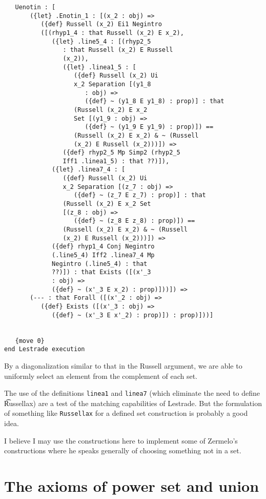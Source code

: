 \documentclass[12pt]{article}
\begin{document}
\begin{verbatim}
   Uenotin : [
       ({let} .Enotin_1 : [(x_2 : obj) => 
          ({def} Russell (x_2) Ei1 Negintro 
          ([(rhyp1_4 : that Russell (x_2) E x_2), 
             ({let} .line5_4 : [(rhyp2_5 
                : that Russell (x_2) E Russell 
                (x_2)), 
                ({let} .linea1_5 : [
                   ({def} Russell (x_2) Ui 
                   x_2 Separation [(y1_8 
                      : obj) => 
                      ({def} ~ (y1_8 E y1_8) : prop)] : that 
                   (Russell (x_2) E x_2 
                   Set [(y1_9 : obj) => 
                      ({def} ~ (y1_9 E y1_9) : prop)]) == 
                   (Russell (x_2) E x_2) & ~ (Russell 
                   (x_2) E Russell (x_2)))]) => 
                ({def} rhyp2_5 Mp Simp2 (rhyp2_5 
                Iff1 .linea1_5) : that ??)]), 
             ({let} .linea7_4 : [
                ({def} Russell (x_2) Ui 
                x_2 Separation [(z_7 : obj) => 
                   ({def} ~ (z_7 E z_7) : prop)] : that 
                (Russell (x_2) E x_2 Set 
                [(z_8 : obj) => 
                   ({def} ~ (z_8 E z_8) : prop)]) == 
                (Russell (x_2) E x_2) & ~ (Russell 
                (x_2) E Russell (x_2)))]) => 
             ({def} rhyp1_4 Conj Negintro 
             (.line5_4) Iff2 .linea7_4 Mp 
             Negintro (.line5_4) : that 
             ??)]) : that Exists ([(x'_3 
             : obj) => 
             ({def} ~ (x'_3 E x_2) : prop)]))]) => 
       (--- : that Forall ([(x'_2 : obj) => 
          ({def} Exists ([(x'_3 : obj) => 
             ({def} ~ (x'_3 E x'_2) : prop)]) : prop)]))]


   {move 0}
end Lestrade execution
\end{verbatim}

By a diagonalization similar to that in the Russell argument, we are able to uniformly select an element from the complement of each set.

The use of the definitions {\tt linea1} and {\tt linea7} (which eliminate the need to define {\t Russellax}) are a test of the matching capabilities of Lestrade.  But the formulation of something like {\tt Russellax} for a defined set construction is probably a good idea.

I believe I may use the constructions here to implement some of Zermelo's constructions where he speaks generally of choosing something not in a set.

\section{The axioms of power set and union}
\end{document}
